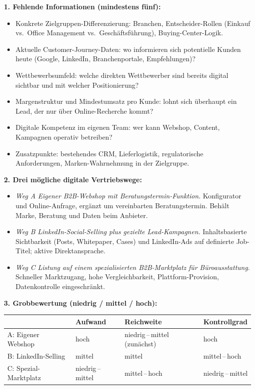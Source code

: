 \documentclass[11pt,a4paper,oneside]{article}
\begin{document}
\begin{loesungbox}
\textbf{1. Fehlende Informationen (mindestens fünf):}
\begin{itemize}
  \item Konkrete Zielgruppen-Differenzierung: Branchen, Entscheider-Rollen (Einkauf vs.\ Office Management vs.\ Geschäftsführung), Buying-Center-Logik.
  \item Aktuelle Customer-Journey-Daten: wo informieren sich potentielle Kunden heute (Google, LinkedIn, Branchenportale, Empfehlungen)?
  \item Wettbewerbsumfeld: welche direkten Wettbewerber sind bereits digital sichtbar \textendash{} und mit welcher Positionierung?
  \item Margenstruktur und Mindestumsatz pro Kunde: lohnt sich überhaupt ein Lead, der nur über Online-Recherche kommt?
  \item Digitale Kompetenz im eigenen Team: wer kann Webshop, Content, Kampagnen operativ betreiben?
  \item Zusatzpunkte: bestehendes CRM, Lieferlogistik, regulatorische Anforderungen, Marken-Wahrnehmung in der Zielgruppe.
\end{itemize}

\textbf{2. Drei mögliche digitale Vertriebswege:}
\begin{itemize}
  \item \emph{Weg A \textendash{} Eigener B2B-Webshop mit Beratungstermin-Funktion.} Konfigurator und Online-Anfrage, ergänzt um vereinbarten Beratungstermin. Behält Marke, Beratung und Daten beim Anbieter.
  \item \emph{Weg B \textendash{} LinkedIn-Social-Selling plus gezielte Lead-Kampagnen.} Inhaltsbasierte Sichtbarkeit (Posts, Whitepaper, Cases) und LinkedIn-Ads auf definierte Job-Titel; aktive Direktansprache.
  \item \emph{Weg C \textendash{} Listung auf einem spezialisierten B2B-Marktplatz für Büroausstattung.} Schneller Marktzugang, hohe Vergleichbarkeit, Plattform-Provision, Datenkontrolle eingeschränkt.
\end{itemize}

\textbf{3. Grobbewertung (niedrig / mittel / hoch):}

\smallskip
\begin{tabularx}{\linewidth}{@{}lXXX@{}}
\toprule
 & \textbf{Aufwand} & \textbf{Reichweite} & \textbf{Kontrollgrad} \\
\midrule
A: Eigener Webshop & hoch & niedrig\,--\,mittel (zunächst) & hoch \\
B: LinkedIn-Selling & mittel & mittel & mittel\,--\,hoch \\
C: Spezial-Marktplatz & niedrig\,--\,mittel & mittel\,--\,hoch & niedrig\,--\,mittel \\
\bottomrule
\end{tabularx}


\end{loesungbox}
\end{document}
